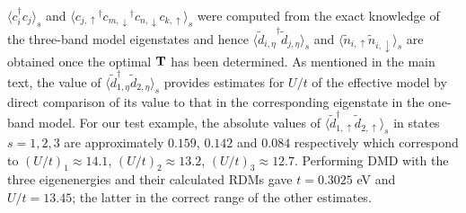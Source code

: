 \documentclass[aps, prb, 11pt]{revtex4-1}
\begin{document}
$\langle c_i^{\dagger} c_j \rangle_s$ and $\langle {c_{j,\uparrow}}^{\dagger} {c_{m,\downarrow}}^{\dagger} c_{n,\downarrow} c_{k,\uparrow} \rangle_{s}$ were computed from the exact knowledge of the three-band model eigenstates and hence $\langle {\tilde{d}_{i,\eta}}^{\dagger} \tilde{d}_{j,\eta} \rangle_{s}$ 
and $\langle \tilde{n}_{i,\uparrow} \tilde{n}_{i,\downarrow} \rangle_{s}$ are obtained 
once the optimal ${\bf T}$ has been determined. 
As mentioned in the main text, the value of $\langle \tilde{d}_{1,\eta}^{\dagger} \tilde{d}_{2,\eta} \rangle_s$ provides estimates for $U/t$ of the effective model by direct comparison of its value to that in the 
corresponding eigenstate in the one-band model. For our test example, the absolute values of $\langle \tilde{d}_{1,\uparrow}^{\dagger} \tilde{d}_{2,\uparrow} \rangle_s$ 
in states $s=1,2,3$ are approximately $0.159$, $0.142$ and $0.084$ respectively which correspond to $(U/t)_1 \approx 14.1 $, $(U/t)_2 \approx 13.2 $, $(U/t)_3 \approx 12.7 $. 
Performing DMD with the three eigenenergies and their calculated RDMs gave $t=0.3025$ eV and $U/t = 13.45 $; the latter in the correct range of the other estimates.  
 


% 

\end{document}
